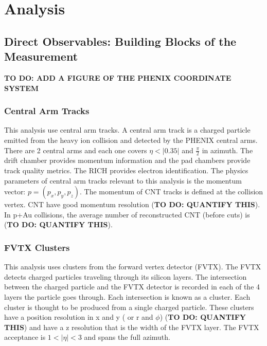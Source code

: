\chapter{Analysis}
\section{Direct Observables: Building Blocks of the Measurement}
\textbf{TO DO: ADD A FIGURE OF THE PHENIX COORDINATE SYSTEM}
\subsection{Central Arm Tracks}
This analysis use central arm tracks. A central arm track is a charged particle emitted from the heavy ion collision and detected by the PHENIX central arms.
There are 2 central arms and each one covers $\eta < |0.35|$ and $\frac{\pi}{2}$ in azimuth. The drift chamber provides momentum information and the
pad chambers provide track quality metrics. The RICH provides electron identification. 
The physics parameters of central arm tracks relevant to this analysis is the momentum vector: $p = (p_x, p_y, p_z)$. The momentum of CNT tracks is defined at the
collision vertex. CNT have good momentum resolution (\textbf{TO DO: QUANTIFY THIS}). In p+Au collisions, the average number of reconstructed CNT (before cuts) is (\textbf{TO DO: QUANTIFY THIS}).
\subsection{FVTX Clusters}
This analysis uses clusters from the forward vertex detector (FVTX). The FVTX detects charged particles traveling through its silicon layers. The intersection between the charged particle
and the FVTX detector is recorded in each of the 4 layers the particle goes through. Each intersection is known as a cluster. Each cluster is thought to be produced from a single charged particle. These clusters have a position resolution in x and y ( or r and $\phi$)
(\textbf{TO DO: QUANTIFY THIS}) and have a z resolution that is the width of the FVTX layer. The FVTX acceptance is $1 < | \eta | < 3$ and spans the full azimuth.
